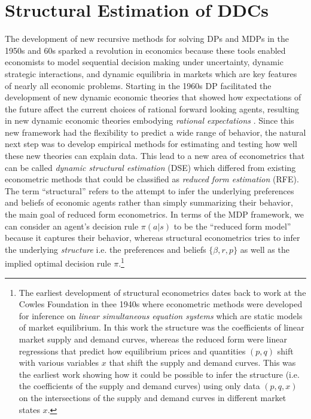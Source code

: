 \section{Structural Estimation of DDCs\label{sec:ddc}}

The development of new recursive methods for solving DPs and MDPs in the 1950s and 60s sparked
a revolution in economics because these tools enabled economists to model sequential
decision making under uncertainty, dynamic strategic interactions, and dynamic equilibria 
in markets which are key features of nearly all economic problems.  Starting in the 1960s
DP facilitated the development of new dynamic economic theories that showed 
how expectations of the future affect the current choices of rational forward looking agents, 
resulting in new dynamic economic theories embodying {\it rational expectations\/} \citet{Muth:1961}. 
Since this new framework had the flexibility to predict a wide range of behavior, the natural
next step was to develop empirical methods for estimating and testing how well these new theories
can explain data. This lead to a new area of econometrics that can be called {\it dynamic structural estimation\/} (DSE)
which differed from existing econometric methods that could be classified as {\it reduced form estimation\/} (RFE). 
The term ``structural'' refers to the attempt to infer the underlying preferences and beliefs of economic
agents rather than simply summarizing their behavior, the main goal of reduced form econometrics.
In terms of the MDP framework, we can consider an agent's decision rule $\pi(a|s)$ to be the ``reduced form model''
because it captures their behavior, whereas structural econometrics tries to infer the underlying
{\it structure\/} i.e. the preferences and beliefs $\{\beta,r,p\}$ as well as the implied optimal decision rule $\pi$.\footnote{\footnotesize
The earliest development of structural econometrics dates back to work at the Cowles Foundation in thee 1940s where
econometric methods were developed for inference on {\it linear simultaneous equation systems\/} which are
static models of market equilibrium. In this work  the structure was the coefficients of linear market
supply and demand curves, whereas the reduced form were linear regressions that predict how equilibrium
prices and quantities $(p,q)$ shift with various variables $x$ that shift the supply and demand curves. 
This was the earliest work showing how it could be possible to infer the structure (i.e. the coefficients of
the supply and demand curves) using only data $(p,q,x)$ on the intersections of the supply and demand curves in 
different market states $x$.}

